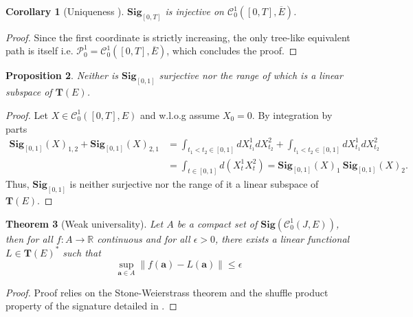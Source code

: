 \documentclass[12pt]{report}
\newtheorem{theorem}{Theorem}[chapter]
\newtheorem{corollary}[theorem]{Corollary}
\newtheorem{proposition}[theorem]{Proposition}
\theoremstyle{definition}
\theoremstyle{remark}
\newcommand{\R}{\mathbb{R}}
\begin{document}
\begin{corollary}[Uniqueness \cite{boedihardjo2016signature}] 
  $\mathbf{Sig}_{[0,T]}$ is injective on $\mathcal{C}^{1}_{0}([0,T],\overline{E})$.
\end{corollary}
\begin{proof}
  Since the first coordinate is strictly increasing, the only tree-like equivalent path is itself i.e. $\mathcal{P}^{1}_{0} = \mathcal{C}^{1}_{0}([0,T],\overline{E})$, which concludes the proof. 
\end{proof}
\begin{proposition}\label{surjective}
  Neither is $\mathbf{Sig}_{[0,1]}$ surjective nor the range of which is a linear subspace of $\mathbf{T}(E)$.
\end{proposition}
\begin{proof}
  Let $X \in \mathcal{C}^{1}_{0}([0,T],E)$ and w.l.o.g assume $X_{0} = 0$. 
  By integration by parts
  \begin{equation}
    \begin{split}
      \mathbf{Sig}_{[0,1]}(X)_{1,2} + \mathbf{Sig}_{[0,1]}(X)_{2,1} &=  \int_{t_{1}<t_{2} \in [0,1]}dX_{t_{1}}^{1}dX_{t_{2}}^{2} + \int_{t_{1}<t_{2} \in [0,1]}dX_{t_{1}}^{1}dX_{t_{2}}^{2}\\
      &=  \int_{t \in [0,1]}d(X_{t}^{1}X_{t}^{2}) = \mathbf{Sig}_{[0,1]}(X)_{1}~\mathbf{Sig}_{[0,1]}(X)_{2}.
    \end{split}
  \end{equation}
  Thus, $\mathbf{Sig}_{[0,1]}$ is neither surjective nor the range of it a linear subspace of $\mathbf{T}(E)$.
\end{proof}

\begin{theorem}[Weak universality]\label{weakuniversality}
  Let $A$ be a compact set of $\mathbf{Sig}(\mathcal{C}^{1}_{0}(J,E))$, then for all $f \colon A \to \R$ continuous and for all $\epsilon > 0$, there exists a linear functional $L \in \mathbf{T}(E)^{*}$ such that 
  \begin{equation}
    \sup_{\mathbf{a}\in A}\lVert f(\mathbf{a}) - L(\mathbf{a})\rVert \leq \epsilon
  \end{equation}
\end{theorem}
\begin{proof}
  Proof relies on the Stone-Weierstrass theorem and the shuffle product property of the signature detailed in \cite{liao2019learning}.
\end{proof}
\end{document}
